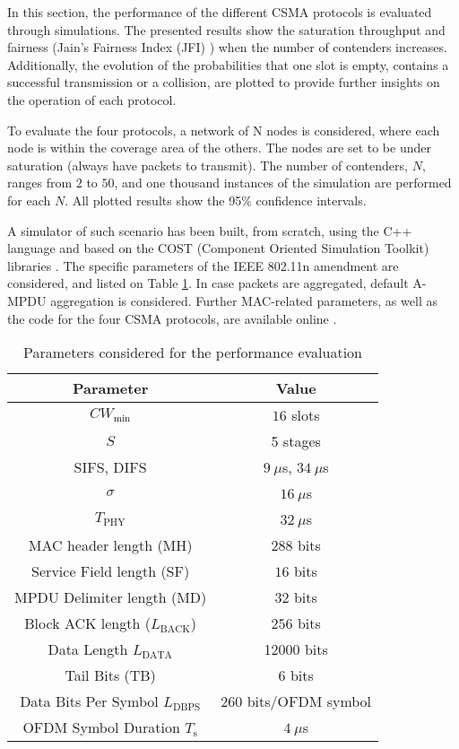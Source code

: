\documentclass[conference]{IEEEtran}
\begin{document}

In this section, the performance of the different CSMA protocols is evaluated through simulations. The presented results show the saturation throughput and fairness (Jain's Fairness Index (JFI) \cite{jain1984quantitative}) when the number of contenders increases. Additionally, the evolution of the probabilities that one slot is empty, contains a successful transmission or a collision, are plotted to provide further insights on the operation of each protocol.

To evaluate the four protocols, a network of N nodes is considered, where each node is within the coverage area of the others. The nodes are set to be under saturation (always have packets to transmit). The number of contenders, $N$, ranges from $2$ to $50$, and one thousand instances of the simulation are performed for each $N$. All plotted results show the 95\% confidence intervals. 

A simulator of such scenario has been built, from scratch, using the C++ language and based on the COST (Component Oriented Simulation Toolkit) libraries \cite{yucesan2002cost}. The specific parameters of the IEEE 802.11n amendment \cite{IEEE80211n} are considered, and listed on Table \ref{Tbl:parameters}. In case packets are aggregated, default A-MPDU aggregation is considered. Further MAC-related parameters, as well as the code for the four CSMA protocols, are available online \cite{SanabriaSimulatorECA2012}.




\begin{table}[h!!!]
\centering
\begin{tabular}{c|c}
Parameter & Value \\
\hline
$CW_{\min}$ & $16$ slots \\
$S$ & 5 stages\\
SIFS, DIFS & $9~\mu$s, $34~\mu$s \\
$\sigma$ & $16~\mu$s \\
$T_{\text{PHY}}$ & $32~\mu$s \\
MAC header length (MH) & $288$ bits \\
Service Field length (SF) & $16$ bits \\
MPDU Delimiter length (MD) & $32$ bits \\
Block ACK length ($L_{\text{BACK}}$) & $256$ bits \\
Data Length $L_{\text{DATA}}$ & 12000 bits \\
Tail Bits (TB) & $6$ bits \\
Data Bits Per Symbol $L_{\text{DBPS}}$ & $260$ bits/OFDM symbol \\
OFDM Symbol Duration $T_{\text{s}}$ & $4~\mu$s \\
\hline
\end{tabular}

\caption{Parameters considered for the performance evaluation}\label{Tbl:parameters}

\end{table}
\end{document}
